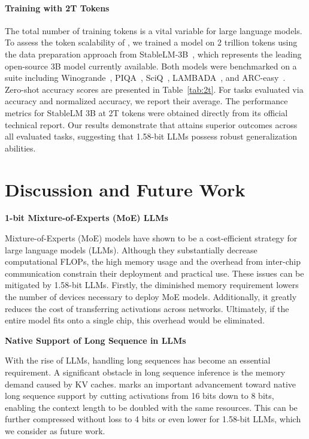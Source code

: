 \paragraph{Training with 2T Tokens}

The total number of training tokens is a vital variable for large language models. To assess the token scalability of , we trained a  model on 2 trillion tokens using the data preparation approach from StableLM-3B~\cite{StableLM-3B-4E1T}, which represents the leading open-source 3B model currently available. Both models were benchmarked on a suite including Winogrande~\cite{winoGrande}, PIQA~\cite{piqa}, SciQ~\cite{sciq}, LAMBADA~\cite{lambada}, and ARC-easy~\cite{arc}. Zero-shot accuracy scores are presented in Table~\ref{tab:2t}. For tasks evaluated via accuracy and normalized accuracy, we report their average. The performance metrics for StableLM 3B at 2T tokens were obtained directly from its official technical report. Our results demonstrate that  attains superior outcomes across all evaluated tasks, suggesting that 1.58-bit LLMs possess robust generalization abilities.

\section{Discussion and Future Work}

\textbf{1-bit Mixture-of-Experts (MoE) LLMs}

Mixture-of-Experts (MoE) models have shown to be a cost-efficient strategy for large language models (LLMs). Although they substantially decrease computational FLOPs, the high memory usage and the overhead from inter-chip communication constrain their deployment and practical use. These issues can be mitigated by 1.58-bit LLMs. Firstly, the diminished memory requirement lowers the number of devices necessary to deploy MoE models. Additionally, it greatly reduces the cost of transferring activations across networks. Ultimately, if the entire model fits onto a single chip, this overhead would be eliminated.

\textbf{Native Support of Long Sequence in LLMs}

With the rise of LLMs, handling long sequences has become an essential requirement. A significant obstacle in long sequence inference is the memory demand caused by KV caches.  marks an important advancement toward native long sequence support by cutting activations from 16 bits down to 8 bits, enabling the context length to be doubled with the same resources. This can be further compressed without loss to 4 bits or even lower for 1.58-bit LLMs, which we consider as future work.


